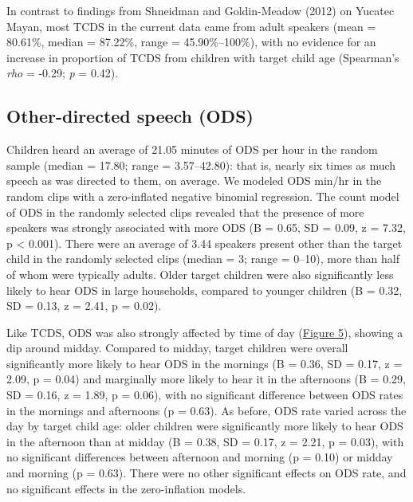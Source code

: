 \documentclass[floatsintext,man]{apa6}
\theoremstyle{definition}
\theoremstyle{definition}
\theoremstyle{definition}
\theoremstyle{remark}
\begin{document}
In contrast to findings from Shneidman and Goldin-Meadow (2012) on
Yucatec Mayan, most TCDS in the current data came from adult speakers
(mean = 80.61\%, median = 87.22\%, range = 45.90\%--100\%), with no
evidence for an increase in proportion of TCDS from children with target
child age (Spearman's \emph{rho} = -0.29; \emph{p} = 0.42).

\subsection{Other-directed speech
(ODS)}\label{other-directed-speech-ods}

Children heard an average of 21.05 minutes of ODS per hour in the random
sample (median = 17.80; range = 3.57--42.80): that is, nearly six times
as much speech as was directed to them, on average. We modeled ODS
min/hr in the random clips with a zero-inflated negative binomial
regression. The count model of ODS in the randomly selected clips
revealed that the presence of more speakers was strongly associated with
more ODS (B = 0.65, SD = 0.09, z = 7.32, p \textless{} 0.001). There
were an average of 3.44 speakers present other than the target child in
the randomly selected clips (median = 3; range = 0--10), more than half
of whom were typically adults. Older target children were also
significantly less likely to hear ODS in large households, compared to
younger children (B = 0.32, SD = 0.13, z = 2.41, p = 0.02).

Like TCDS, ODS was also strongly affected by time of day
(\protect\hyperlink{fig5}{Figure 5}), showing a dip around midday.
Compared to midday, target children were overall significantly more
likely to hear ODS in the mornings (B = 0.36, SD = 0.17, z = 2.09, p =
0.04) and marginally more likely to hear it in the afternoons (B = 0.29,
SD = 0.16, z = 1.89, p = 0.06), with no significant difference between
ODS rates in the mornings and afternoons (p = 0.63). As before, ODS rate
varied across the day by target child age: older children were
significantly more likely to hear ODS in the afternoon than at midday (B
= 0.38, SD = 0.17, z = 2.21, p = 0.03), with no significant differences
between afternoon and morning (p = 0.10) or midday and morning (p =
0.63). There were no other significant effects on ODS rate, and no
significant effects in the zero-inflation models.
\end{document}
